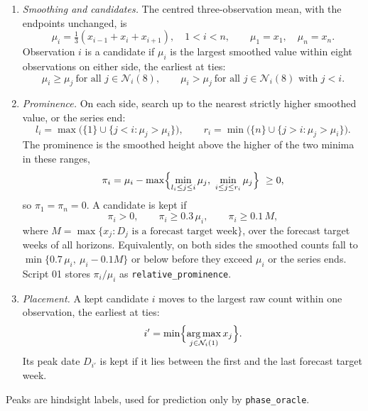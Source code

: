 \documentclass[11pt,a4paper]{article}
\DeclareMathOperator*{\argmax}{arg\,max}
\theoremstyle{definition}
\theoremstyle{remark}
\begin{document}
\begin{enumerate}[leftmargin=*,itemsep=2pt]
\item \emph{Smoothing and candidates.} The centred three-observation mean,
with the endpoints unchanged, is
\begin{equation}
 \mu_i=\tfrac13(x_{i-1}+x_i+x_{i+1}),\quad 1<i<n,\qquad
 \mu_1=x_1,\quad\mu_n=x_n.
 \label{eq:peak-smoothing}
\end{equation}
Observation $i$ is a candidate if $\mu_i$ is the largest smoothed value
within eight observations on either side, the earliest at ties:
\begin{equation}
 \mu_i\ge\mu_j\ \text{for all } j\in\mathcal N_i(8),\qquad
 \mu_i>\mu_j\ \text{for all } j\in\mathcal N_i(8)\text{ with }j<i.
 \label{eq:peak-candidate}
\end{equation}
\item \emph{Prominence.} On each side, search up to the nearest strictly
higher smoothed value, or the series end:
\begin{equation}
 l_i=\max\bigl(\{1\}\cup\{j<i:\mu_j>\mu_i\}\bigr),\qquad
 r_i=\min\bigl(\{n\}\cup\{j>i:\mu_j>\mu_i\}\bigr).
 \label{eq:peak-search}
\end{equation}
The prominence is the smoothed height above the higher of the two minima
in these ranges,
\begin{equation}
 \pi_i=\mu_i-\max\Bigl\{\min_{l_i\le j\le i}\mu_j,\
 \min_{i\le j\le r_i}\mu_j\Bigr\}\ \ge0,
 \label{eq:peak-prominence}
\end{equation}
so $\pi_1=\pi_n=0$. A candidate is kept if
\begin{equation}
 \pi_i>0,\qquad\pi_i\ge0.3\,\mu_i,\qquad\pi_i\ge0.1\,M,
 \label{eq:peak-prominence-rule}
\end{equation}
where $M=\max\{x_j:D_j\text{ is a forecast target week}\}$, over the
forecast target weeks of all horizons. Equivalently, on both
sides the smoothed counts fall to $\min\{0.7\,\mu_i,\ \mu_i-0.1M\}$ or
below before they exceed $\mu_i$ or the series ends. Script 01 stores
$\pi_i/\mu_i$ as \texttt{relative\_prominence}.
\item \emph{Placement.} A kept candidate $i$ moves to the largest raw count
within one observation, the earliest at ties:
\begin{equation}
 i'=\min\Bigl\{\argmax_{j\in\mathcal N_i(1)}x_j\Bigr\}.
 \label{eq:peak-placement}
\end{equation}
Its peak date $D_{i'}$ is kept if it lies between the first and the last
forecast target week.
\end{enumerate}
Peaks are hindsight labels, used for prediction only by \texttt{phase\_oracle}.
\end{document}
